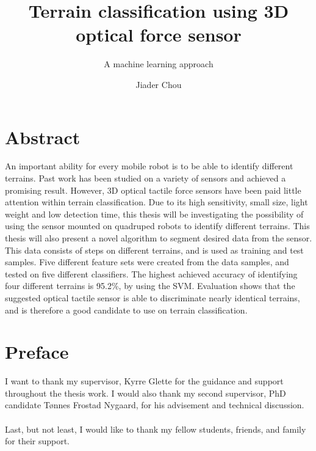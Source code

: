 \documentclass[USenglish]{ifimaster}  %
\title{Terrain classification using 3D optical force sensor}        %
\subtitle{A machine learning approach}
\date{}
\author{Jiader Chou}                      %
\begin{document}
	\ififorside{}
	\frontmatter{}
	\maketitle{}
	
	\frontmatter{}
\chapter*{Abstract}                   %
An important ability for every mobile robot is to be able to identify different terrains. Past work has been studied on a variety of sensors and achieved a promising result. However, 3D optical tactile force sensors have been paid little attention within terrain classification. Due to its high sensitivity, small size, light weight and low detection time, this thesis will be investigating the possibility of using the sensor mounted on quadruped robots to identify different terrains. This thesis will also present a novel algorithm to segment desired data from the sensor. This data consists of steps on different terrains, and is used as training and test samples. Five different feature sets were created from the data samples, and tested on five different classifiers. The highest achieved accuracy of identifying four different terrains is 95.2\%, by using the SVM. Evaluation shows that the suggested optical tactile sensor is able to discriminate nearly identical terrains, and is therefore a good candidate to use on terrain classification.
\tableofcontents{}
\listoffigures{}
\listoftables{}
	
\chapter*{Preface}                    %
I want to thank my supervisor, Kyrre Glette for the guidance and support throughout the thesis work. I would also thank my second supervisor, PhD candidate Tønnes Frostad Nygaard, for his advisement and technical discussion.
\\
\\
Last, but not least, I would like to thank my fellow students, friends, and family for their support.

	

\mainmatter{}
\pagestyle{MyStyle}
\end{document}
